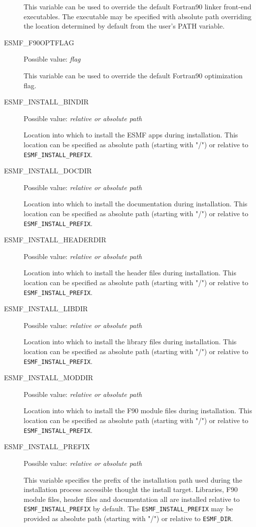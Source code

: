 \begin{description}
This variable can be used to override the default Fortran90 linker
front-end executables. The executable may be specified with absolute path
overriding the location determined by default from the user's PATH variable.

\item[ESMF\_F90OPTFLAG]
Possible value: {\em flag}

This variable can be used to override the default  Fortran90 optimization flag.

\item[ESMF\_INSTALL\_BINDIR]
Possible value: {\em relative or absolute path}

Location into which to install the ESMF apps during installation. This
location can be specified as absolute path (starting with "/") or relative to
{\tt ESMF\_INSTALL\_PREFIX}.

\item[ESMF\_INSTALL\_DOCDIR]
Possible value: {\em relative or absolute path}

Location into which to install the documentation during installation. This
location can be specified as absolute path (starting with "/") or relative to
{\tt ESMF\_INSTALL\_PREFIX}.

\item[ESMF\_INSTALL\_HEADERDIR]
Possible value: {\em relative or absolute path}

Location into which to install the header files during installation. This
location can be specified as absolute path (starting with "/") or relative to
{\tt ESMF\_INSTALL\_PREFIX}.

\item[ESMF\_INSTALL\_LIBDIR]
Possible value: {\em relative or absolute path}

Location into which to install the library files during installation. This
location can be specified as absolute path (starting with "/") or relative to
{\tt ESMF\_INSTALL\_PREFIX}.

\item[ESMF\_INSTALL\_MODDIR]
Possible value: {\em relative or absolute path}

Location into which to install the F90 module files during installation. This
location can be specified as absolute path (starting with "/") or relative to
{\tt ESMF\_INSTALL\_PREFIX}.

\item[ESMF\_INSTALL\_PREFIX]
Possible value: {\em relative or absolute path}

This variable specifies the prefix of the installation path used during the
installation process accessible thought the install target. Libraries, F90
module files, header files and documentation all are installed relative to
{\tt ESMF\_INSTALL\_PREFIX} by default. The {\tt ESMF\_INSTALL\_PREFIX} may be
provided as absolute path (starting with "/") or relative to {\tt ESMF\_DIR}.


\end{description}
